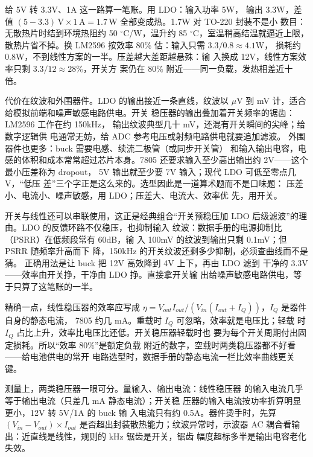 给 5V 转 3.3V、1A 这一路算一笔账。用 LDO：输入功率 5W，
输出 3.3W，差值 $(5-3.3)\,\mathrm{V} \times 1\,\mathrm{A}
= 1.7\,\mathrm{W}$ 全部变成热。1.7W 对 TO-220 封装不是小
数目：无散热片时结到环境热阻约 50 $^{\circ}$C/W，温升约
85 $^{\circ}$C，室温稍高结温就逼近上限，散热片省不掉。换
LM2596 按效率 80\% 估：输入只需 $3.3/0.8 \approx 4.1$W，
损耗约 0.8W，不到线性方案的一半。压差越大差距越悬殊：输
入换成 12V，线性方案效率只剩 $3.3/12 \approx 28\%$，开关方
案仍在 80\% 附近——同一负载，发热相差近十倍。

代价在纹波和外围器件。LDO 的输出接近一条直线，纹波以
$\mu$V 到 mV 计，适合给模拟前端和噪声敏感电路供电。开关
稳压器的输出叠加着开关频率的锯齿：LM2596 工作在约 150kHz，
输出纹波典型几十 mV，还混有开关瞬间的尖峰；给数字逻辑供
电通常无妨，给 ADC 参考电压或射频电路供电就要追加滤波。
外围器件也更多：buck 需要电感、续流二极管（或同步开关管）
和输入输出电容，电感的体积和成本常常超过芯片本身。7805
还要求输入至少高出输出约 2V——这个最小压差称为 dropout，
5V 输出就至少要 7V 输入；现代 LDO 可低至零点几 V，“低压
差”三个字正是这么来的。选型因此是一道算术题而不是口味题：
压差小、电流小、噪声敏感，用 LDO；压差大、电流大、效率优
先，用开关。

开关与线性还可以串联使用，这正是经典组合“开关预稳压加
LDO 后级滤波”的理由。LDO 的反馈环路不仅稳压，也抑制输入
纹波：数据手册的电源抑制比（PSRR）在低频段常有 60dB，输
入 100mV 的纹波到输出只剩 0.1mV；但 PSRR 随频率升高而下
降，150kHz 的开关纹波还剩多少抑制，必须查曲线而不是猜。
正确用法是让 buck 把 12V 高效降到 4V 上下，再由 LDO 滤到
干净的 3.3V——效率由开关挣，干净由 LDO 挣。直接拿开关输
出给噪声敏感电路供电，等于只算了这笔账的一半。

精确一点，线性稳压器的效率应写成 $\eta = V_{out} I_{out}
/ (V_{in} (I_{out} + I_Q))$，$I_Q$ 是器件自身的静态电流，
7805 约几 mA。重载时 $I_Q$ 可忽略，效率就是电压比；轻载
时 $I_Q$ 占比上升，效率比电压比还低。开关稳压器轻载时也
要为每个开关周期付出固定损耗。所以“效率 80\%”是额定负载
附近的数字，空载时两类稳压器都不好看——给电池供电的常开
电路选型时，数据手册的静态电流一栏比效率曲线更关键。

测量上，两类稳压器一眼可分。量输入、输出电流：线性稳压器
的输入电流几乎等于输出电流（只差几 mA 静态电流）；开关稳
压器的输入电流按功率折算明显更小，12V 转 5V/1A 的 buck 输
入电流只有约 0.5A。器件烫手时，先算 $(V_{in}-V_{out})
\times I_{out}$ 是否超出封装散热能力；纹波异常时，示波器
AC 耦合看输出：近直线是线性，规则的 kHz 锯齿是开关，锯齿
幅度超标多半是输出电容老化失效。

